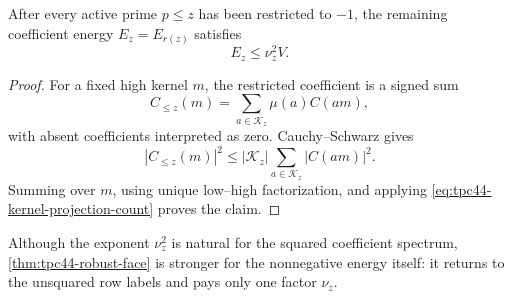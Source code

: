 \begin{proposition}
\label{prop:tpc44-low-restriction-energy}
After every active prime \(p\le z\) has been restricted to \(-1\), the
remaining coefficient energy \(E_z=E_{r(z)}\) satisfies
\begin{equation}
 E_z\le\nu_z^2V.
 \label{eq:tpc44-low-energy-bound}
\end{equation}
\end{proposition}

\begin{proof}
For a fixed high kernel \(m\), the restricted coefficient is a signed
sum
\begin{equation}
 C_{\le z}(m)
 =\sum_{a\in\mathcal K_z}\mu(a)C(am),
 \label{eq:tpc44-low-kernel-sum}
\end{equation}
with absent coefficients interpreted as zero.  Cauchy--Schwarz gives
\begin{equation}
 |C_{\le z}(m)|^2
 \le|\mathcal K_z|\sum_{a\in\mathcal K_z}|C(am)|^2.
 \label{eq:tpc44-low-kernel-Cauchy}
\end{equation}
Summing over \(m\), using unique low--high factorization, and applying
\eqref{eq:tpc44-kernel-projection-count} proves the claim.
\end{proof}

Although the exponent \(\nu_z^2\) is natural for the squared coefficient
spectrum, \cref{thm:tpc44-robust-face} is stronger for the nonnegative
energy itself: it returns to the unsquared row labels and pays only one
factor \(\nu_z\).
